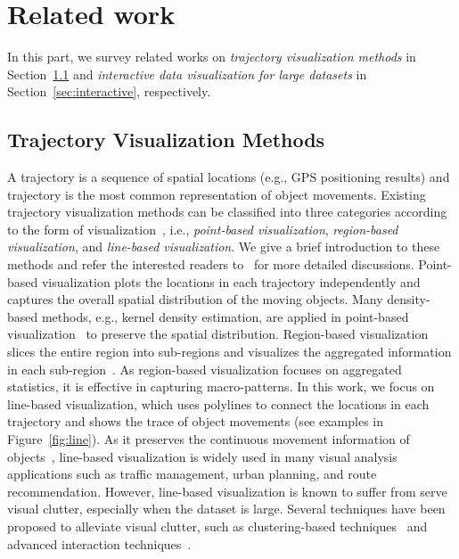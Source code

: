 \section{Related work}\label{sec:rel}

In this part, we survey related works on \textit{trajectory visualization methods} in Section~\ref{sec:trajvisana} and \textit{interactive data visualization for large datasets} in Section~\ref{sec:interactive}, respectively.

\subsection{Trajectory Visualization Methods}\label{sec:trajvisana}
A trajectory is a sequence of spatial locations (e.g., GPS positioning results) and trajectory is the most common representation of object movements. Existing trajectory visualization methods can be classified into three categories according to the form of visualization~\cite{chen2015survey}, i.e., \textit{point-based visualization}, \textit{region-based visualization}, and \textit{line-based visualization}. We give a brief introduction to these methods and refer the interested readers to~\cite{chen2015survey} for more detailed discussions. Point-based visualization plots the locations in each trajectory independently and captures the overall spatial distribution of the moving objects. Many density-based methods, e.g., kernel density estimation, are applied in point-based visualization~\cite{liu2013vait,yang2016exploring,chae2014public,xie2008kernel, borruso2008network} to preserve the spatial distribution. Region-based visualization slices the entire region into sub-regions and visualizes the aggregated information in each sub-region~\cite{guo2009flow,wood2010visualisation,von2015mobilitygraphs}. As region-based visualization focuses on aggregated statistics, it is effective in capturing macro-patterns. In this work, we focus on line-based visualization, which uses polylines to connect the locations in each trajectory and shows the trace of object movements (see examples in Figure~\ref{fig:line}). As it preserves the continuous movement information of objects~\cite{guo2011tripvista,hurter2009fromdady}, line-based visualization is widely used in many visual analysis applications such as traffic management, urban planning, and route recommendation. However, line-based visualization is known to suffer from serve visual clutter, especially when the dataset is large. Several techniques have been proposed to alleviate visual clutter, such as clustering-based techniques~\cite{ferreira2013vector, rinzivillo2008visually, von2015mobilitygraphs} and advanced interaction techniques~\cite{kruger2013trajectorylenses, ferreira2013visual}.



